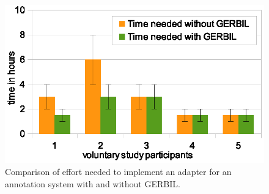 \begin{figure}
\centering
\includegraphics[width=\columnwidth]{user_study.eps}
\caption{Comparison of effort needed to implement an adapter for an annotation system with and without GERBIL.}
\label{ref:comparedTime}
\end{figure}
